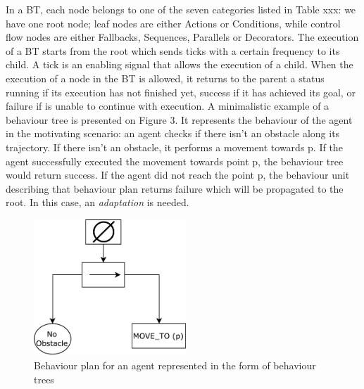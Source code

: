 \documentclass[journal]{IEEEtran}
\theoremstyle{definition}
\newcommand\patrizio[1]{\nb{Patrizio}{#1}}
\begin{document}
In a BT, each node belongs to one of the seven categories listed in Table xxx: we have one root node; leaf nodes are either Actions or Conditions, while control flow nodes are either Fallbacks, Sequences, Parallels or Decorators.
The execution of a BT starts from the root which sends ticks with a certain frequency to its child. A tick is an enabling signal that allows the execution of a child. When the execution of a node in the BT is allowed, it returns to the parent a status running if its execution has not finished yet, success if it has achieved its goal, or failure if is unable to continue with execution. A minimalistic example of a behaviour tree is presented on Figure 3. It represents the  behaviour of the agent in the motivating scenario: an agent checks if there isn't an obstacle along its trajectory. If there isn't an obstacle, it performs a movement towards p.
If the agent successfully executed the movement towards point p, the behaviour tree would return success. If the agent did not reach the point p, the behaviour unit describing that behaviour plan returns failure which will be propagated to the root. In this case, an \textit{adaptation}  is needed.

\begin{figure}[h]
\includegraphics[width=2.25in]{Figures/BP2.pdf}
\caption{Behaviour plan for an agent represented in the form of behaviour trees}
\end{figure}














\end{document}
